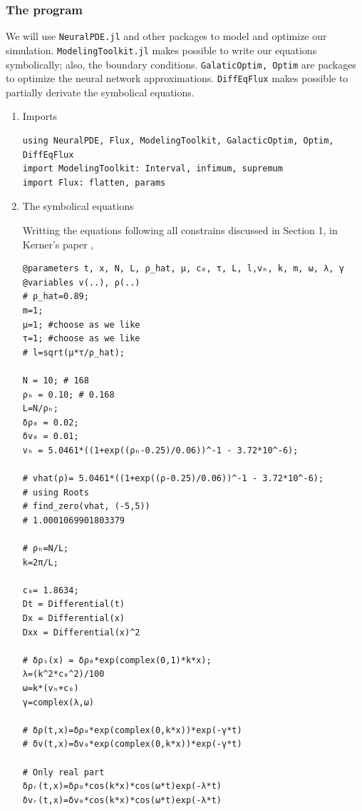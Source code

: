 \documentclass[11pt]{article}
\begin{document}
\subsubsection{The program}
\label{sec:org161d5a3}

We will use \texttt{NeuralPDE.jl} and other packages to model and optimize our
simulation. \texttt{ModelingToolkit.jl} makes possible to write our equations
symbolically; also, the boundary conditions. \texttt{GalaticOptim, Optim} are packages
to optimize the neural network approximations. \texttt{DiffEqFlux} makes possible to
partially derivate the symbolical equations.

\begin{enumerate}
\item Imports
\label{sec:org75211a0}
\begin{verbatim}
using NeuralPDE, Flux, ModelingToolkit, GalacticOptim, Optim, DiffEqFlux
import ModelingToolkit: Interval, infimum, supremum
import Flux: flatten, params
\end{verbatim}

\item The symbolical equations
\label{sec:orgb0e2c86}

Writting the equations following all constrains discussed in Section 1, in
Kerner's paper \cite{kerner1993},

\begin{verbatim}
@parameters t, x, N, L, ρ_hat, μ, c₀, τ, L, l,vₕ, k, m, ω, λ, γ
@variables v(..), ρ(..)
# ρ_hat=0.89;
m=1;
μ=1; #choose as we like
τ=1; #choose as we like
# l=sqrt(μ*τ/ρ_hat);

N = 10; # 168
ρₕ = 0.10; # 0.168
L=N/ρₕ;
δρ₀ = 0.02;
δv₀ = 0.01;
vₕ = 5.0461*((1+exp((ρₕ-0.25)/0.06))^-1 - 3.72*10^-6);

# vhat(ρ)= 5.0461*((1+exp((ρ-0.25)/0.06))^-1 - 3.72*10^-6);
# using Roots
# find_zero(vhat, (-5,5))
# 1.0001069901803379

# ρₕ=N/L;
k=2π/L;

c₀= 1.8634;
Dt = Differential(t)
Dx = Differential(x)
Dxx = Differential(x)^2

# δρₛ(x) = δρ₀*exp(complex(0,1)*k*x);
λ=(k^2*c₀^2)/100
ω=k*(vₕ+c₀)
γ=complex(λ,ω)

# δρ(t,x)=δρ₀*exp(complex(0,k*x))*exp(-γ*t)
# δv(t,x)=δv₀*exp(complex(0,k*x))*exp(-γ*t)

# Only real part
δρᵣ(t,x)=δρ₀*cos(k*x)*cos(ω*t)exp(-λ*t)
δvᵣ(t,x)=δv₀*cos(k*x)*cos(ω*t)exp(-λ*t)


\end{verbatim}
\end{enumerate}
\end{document}
